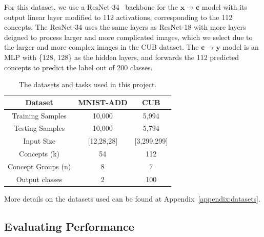 For this dataset, we use a ResNet-34~\cite{resnet} backbone for the 
$\mathbf{x} \to \mathbf{c}$
model with its output linear layer modified to 112 activations, corresponding
to the 112 concepts. The ResNet-34 uses the same layers as ResNet-18
with more layers deigned to process larger and more complicated images,
which we select due to the larger and more complex images in the CUB dataset.
The $\mathbf{c} \to \mathbf{y}$ model is an MLP with \{128, 128\} as the hidden
layers, and forwards the 112 predicted concepts to predict the label out of 200 classes.


\begin{table}
    \centering
    \renewcommand{\arraystretch}{1.5}
    \begin{tabular}{c|cc}

    Dataset & MNIST-ADD & CUB \\
    \hline
    Training Samples & 10,000 & 5,994 \\
    Testing Samples & 10,000 & 5,794 \\
    Input Size & [12,28,28] & [3,299,299]\\
    Concepts (k) & 54 & 112 \\
    Concept Groups (n) & 8 & 7 \\
    Output classes & 2 & 100
    \end{tabular}
    \caption{The datasets and tasks used in this project.}
    \label{table:datasets}
\end{table}

More details on the datasets used can be found at Appendix~\ref{appendix:datasets}.

\subsection{Evaluating Performance}


